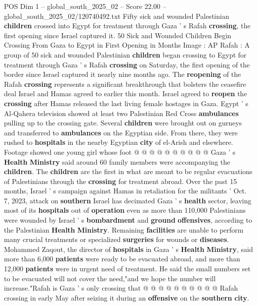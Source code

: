 \begin{textsample}{POS Dim 1 – global\_south\_2025\_02 – Score 22.00 – global\_south\_2025\_02/120740492.txt}  \label{ex:f1_pos_415}
Fifty sick and wounded Palestinian \textbf{children} crossed into Egypt for treatment through Gaza ' s Rafah \textbf{crossing}, the first opening since Israel captured it. 50 Sick and Wounded Children Begin Crossing From Gaza to Egypt in First Opening in Months Image : AP Rafah : A group of 50 sick and wounded Palestinian \textbf{children} began crossing to Egypt for treatment through Gaza ' s Rafah \textbf{crossing} on Saturday, the first opening of the border since Israel captured it nearly nine months ago.
The \textbf{reopening} of the Rafah \textbf{crossing} represents a significant breakthrough that bolsters the ceasefire deal Israel and Hamas agreed to earlier this month.
Israel agreed to \textbf{reopen} the \textbf{crossing} after Hamas released the last living female hostages in Gaza.
Egypt ' s Al-Qahera television showed at least two Palestinian Red Cross \textbf{ambulances} pulling up to the crossing gate.
Several \textbf{children} were brought out on gurneys and transferred to \textbf{ambulances} on the Egyptian side.
From there, they were rushed to \textbf{hospitals} in the nearby Egyptian \textbf{city} of el-Arish and elsewhere.
Footage showed one young girl whose foot @ @ @ @ @ @ @ @ @ @ Gaza ' s \textbf{Health} \textbf{Ministry} said around 60 family members were accompanying the \textbf{children}.
The \textbf{children} are the first in what are meant to be regular evacuations of Palestinians through the \textbf{crossing} for treatment abroad.
Over the past 15 months, Israel ' s campaign against Hamas in retaliation for the militants ' Oct. 7, 2023, attack on \textbf{southern} Israel has decimated Gaza ' s \textbf{health} sector, leaving most of its \textbf{hospitals} out of \textbf{operation} even as more than 110,000 Palestinians were wounded by Israel ' s \textbf{bombardment} and \textbf{ground} \textbf{offensives}, according to the Palestinian \textbf{Health} \textbf{Ministry}.
Remaining \textbf{facilities} are unable to perform many crucial treatments or specialized \textbf{surgeries} for wounds or \textbf{diseases}.
Mohammed Zaqout, the director of \textbf{hospitals} in Gaza ' s \textbf{Health} \textbf{Ministry}, said more than 6,000 \textbf{patients} were ready to be evacuated abroad, and more than 12,000 \textbf{patients} were in urgent need of treatment.
He said the small numbers set to be evacuated will not cover the need,"and we hope the number will increase."Rafah is Gaza ' s only crossing that @ @ @ @ @ @ @ @ @ @ Rafah crossing in early May after seizing it during an \textbf{offensive} on the \textbf{southern} \textbf{city}.

\end{textsample}
